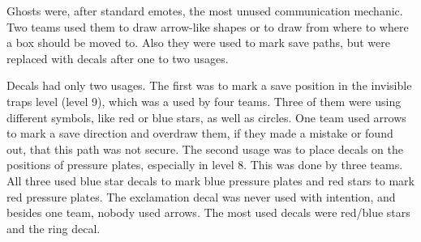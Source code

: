 Ghosts were, after standard emotes, the most unused communication mechanic. Two teams used them to draw arrow-like shapes or to draw from where to where a box should be moved to. Also they were used to mark save paths, but were replaced with decals after one to two usages.

Decals had only two usages. The first was to mark a save position in the invisible traps level (level 9), which was a used by four teams. Three of them were using different symbols, like red or blue stars, as well as circles. One team used arrows to mark a save direction and overdraw them, if they made a mistake or found out, that this path was not secure.
The second usage was to place decals on the positions of pressure plates, especially in level 8. This was done by three teams. All three used blue star decals to mark blue pressure plates and red stars to mark red pressure plates. The exclamation decal was never used with intention, and besides one team, nobody used arrows. The most used decals were red/blue stars and the ring decal.